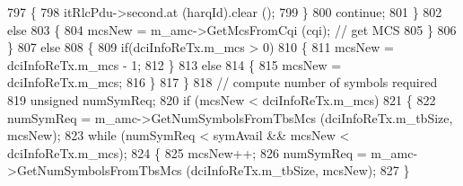 \begin{DoxyCode}
797 \textcolor{comment}{                                                \{}
798 \textcolor{comment}{                                                        itRlcPdu->second.at (harqId).clear ();}
799 \textcolor{comment}{                                                \}}
800 \textcolor{comment}{                                                continue;}
801 \textcolor{comment}{                                        \}}
802 \textcolor{comment}{                                        else}
803 \textcolor{comment}{                                        \{}
804 \textcolor{comment}{                                                mcsNew = m\_amc->GetMcsFromCqi (cqi);  // get MCS}
805 \textcolor{comment}{                                        \}}
806 \textcolor{comment}{                                \}}
807 \textcolor{comment}{                                else}
808 \textcolor{comment}{                                \{}
809 \textcolor{comment}{                                        if(dciInfoReTx.m\_mcs > 0)}
810 \textcolor{comment}{                                        \{}
811 \textcolor{comment}{                                                mcsNew = dciInfoReTx.m\_mcs - 1;}
812 \textcolor{comment}{                                        \}}
813 \textcolor{comment}{                                        else}
814 \textcolor{comment}{                                        \{}
815 \textcolor{comment}{                                                mcsNew = dciInfoReTx.m\_mcs;}
816 \textcolor{comment}{                                        \}}
817 \textcolor{comment}{                                \}}
818 \textcolor{comment}{                                // compute number of symbols required}
819 \textcolor{comment}{                                unsigned numSymReq;}
820 \textcolor{comment}{                                if (mcsNew < dciInfoReTx.m\_mcs)}
821 \textcolor{comment}{                                \{}
822 \textcolor{comment}{                                        numSymReq = m\_amc->GetNumSymbolsFromTbsMcs (dciInfoReTx.m\_tbSize,
       mcsNew);}
823 \textcolor{comment}{                                        while (numSymReq < symAvail && mcsNew < dciInfoReTx.m\_mcs);}
824 \textcolor{comment}{                                        \{}
825 \textcolor{comment}{                                                mcsNew++;}
826 \textcolor{comment}{                                                numSymReq = m\_amc->GetNumSymbolsFromTbsMcs
       (dciInfoReTx.m\_tbSize, mcsNew);}
827 \textcolor{comment}{                                        \}}

\end{DoxyCode}
